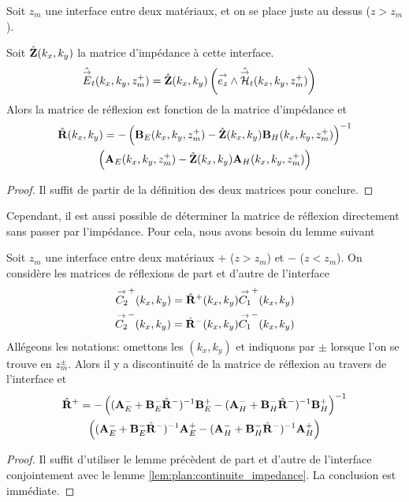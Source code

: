         \begin{lemme}
            \label{lem:plan:reflexion_from_impedance}
            Soit \(z_m\) une interface entre deux matériaux, et on se place juste au dessus (\(z>z_m\)). 

            Soit \(\hat{\mathbf{Z}}(k_x,k_y)\) la matrice d'impédance à cette interface.
            \begin{align*}
                \hat{{\overset{\rightarrow}{E}}}_t(k_x,k_y,z_m^+) &= \hat{\mathbf{Z}}(k_x,k_y) \left({\overset{\rightarrow}{e_z}} \wedge \hat{{\overset{\rightarrow}{\mathcal{H}}}}_t(k_x,k_y,z_m^+)\right)
            \end{align*}
            Alors la matrice de réflexion est fonction de la matrice d'impédance et
            \begin{multline*}
                    \hat{\mathbf{R}}(k_x,k_y) = - \left(\mathbf{B}_E(k_x,k_y,z_m^+) - \hat{\mathbf{Z}}(k_x,k_y) \mathbf{B}_H(k_x,k_y,z_m^+) \right)^{-1}\\
                    \left(\mathbf{A}_E(k_x,k_y,z_m^+) - \hat{\mathbf{Z}}(k_x,k_y) \mathbf{A}_H(k_x,k_y,z_m^+) \right)
            \end{multline*}
        \end{lemme}
        \begin{proof}
            Il suffit de partir de la définition des deux matrices pour conclure.
        \end{proof}

        Cependant, il est aussi possible de déterminer la matrice de réflexion directement sans passer par l'impédance. Pour cela, nous avons besoin du lemme suivant

        \begin{lemme}
            \label{lem:plan:discontinuite_reflexion}
            Soit \(z_m\) une interface entre deux matériaux \(+\) (\(z>z_m\)) et \(-\) (\(z<z_m\)). On considère les matrices de réflexions de part et d'autre de l'interface
            \begin{align*}
                {\overset{\rightarrow}{C_2}}^+(k_x,k_y)  = \hat{\mathbf{R}}^+(k_x,k_y) {\overset{\rightarrow}{C_1}}^+(k_x,k_y)
                \\
                {\overset{\rightarrow}{C_2}}^-(k_x,k_y)  = \hat{\mathbf{R}}^-(k_x,k_y) {\overset{\rightarrow}{C_1}}^-(k_x,k_y)
            \end{align*}
            Allégeons les notations: omettons les \((k_x,k_y)\) et indiquons par \(\pm\) lorsque l'on se trouve en \(z_m^\pm\).
            Alors il y a discontinuité de la matrice de réflexion au travers de l'interface et
            \begin{multline*}
            \hat{\mathbf{R}}^+ = - \left((\mathbf{A}_E^- + \mathbf{B}_E^-\hat{\mathbf{R}}^-)^{-1}\mathbf{B}_E^+ - (\mathbf{A}_H^- + \mathbf{B}_H^-\hat{\mathbf{R}}^-)^{-1}\mathbf{B}_H^+\right)^{-1}
            \\
            \left((\mathbf{A}_E^- + \mathbf{B}_E^-\hat{\mathbf{R}}^-)^{-1}\mathbf{A}_E^+ - (\mathbf{A}_H^- + \mathbf{B}_H^-\hat{\mathbf{R}}^-)^{-1}\mathbf{A}_H^+\right)
            \end{multline*}
        \end{lemme}
        \begin{proof}
            Il suffit d'utiliser le lemme précèdent de part et d'autre de l'interface conjointement avec le lemme \ref{lem:plan:continuite_impedance}. La conclusion est immédiate.
        \end{proof}

